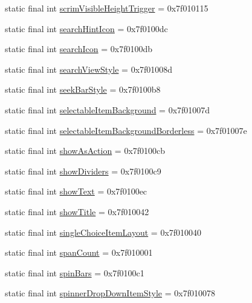 \begin{CompactItemize}
static final int \hyperlink{classandroid_1_1support_1_1v4_1_1_r_1_1attr_afbc18e7ea9cd203965364d9a55850a0}{scrimVisibleHeightTrigger} = 0x7f010115
\item 
static final int \hyperlink{classandroid_1_1support_1_1v4_1_1_r_1_1attr_8a0504d158cd41b1a5813b84b133e7d4}{searchHintIcon} = 0x7f0100dc
\item 
static final int \hyperlink{classandroid_1_1support_1_1v4_1_1_r_1_1attr_e37c911f681ebdd8c4de4c29be22d3bf}{searchIcon} = 0x7f0100db
\item 
static final int \hyperlink{classandroid_1_1support_1_1v4_1_1_r_1_1attr_8d2251c46193e4b57dac7dd5002f6223}{searchViewStyle} = 0x7f01008d
\item 
static final int \hyperlink{classandroid_1_1support_1_1v4_1_1_r_1_1attr_17f7dba9469994c3c6cf6b6d0fa63276}{seekBarStyle} = 0x7f0100b8
\item 
static final int \hyperlink{classandroid_1_1support_1_1v4_1_1_r_1_1attr_d9db3dee6d2010909cc30dd89afd3c27}{selectableItemBackground} = 0x7f01007d
\item 
static final int \hyperlink{classandroid_1_1support_1_1v4_1_1_r_1_1attr_c6f224606df449aae4248b87acc74f65}{selectableItemBackgroundBorderless} = 0x7f01007e
\item 
static final int \hyperlink{classandroid_1_1support_1_1v4_1_1_r_1_1attr_bc7779682c77f36eee2765e85ff479fb}{showAsAction} = 0x7f0100cb
\item 
static final int \hyperlink{classandroid_1_1support_1_1v4_1_1_r_1_1attr_d3e3dfd43274622c28a9fd14d2302e98}{showDividers} = 0x7f0100c9
\item 
static final int \hyperlink{classandroid_1_1support_1_1v4_1_1_r_1_1attr_7f6630f20c86cc2dac68bb38bbc4ffa4}{showText} = 0x7f0100ec
\item 
static final int \hyperlink{classandroid_1_1support_1_1v4_1_1_r_1_1attr_45a7aaafeafd6863d28d4632bf06d843}{showTitle} = 0x7f010042
\item 
static final int \hyperlink{classandroid_1_1support_1_1v4_1_1_r_1_1attr_b631b6db9670ca8be8ff7746f872140e}{singleChoiceItemLayout} = 0x7f010040
\item 
static final int \hyperlink{classandroid_1_1support_1_1v4_1_1_r_1_1attr_ef23aedcf6cd79b60a7fad6fecbe4b84}{spanCount} = 0x7f010001
\item 
static final int \hyperlink{classandroid_1_1support_1_1v4_1_1_r_1_1attr_129d64d96d215ef261b955533a8921a9}{spinBars} = 0x7f0100c1
\item 
static final int \hyperlink{classandroid_1_1support_1_1v4_1_1_r_1_1attr_d020851f3cfd9b72e6211ebd5a1a7920}{spinnerDropDownItemStyle} = 0x7f010078

\end{CompactItemize}
